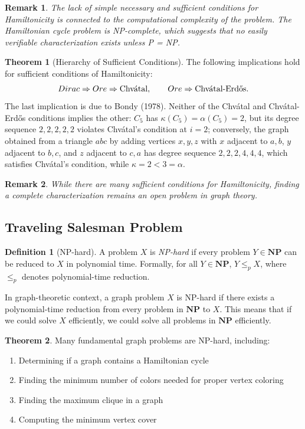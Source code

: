\documentclass{article}
\newtheorem{remark}{Remark}
\theoremstyle{definition}
\newtheorem{theorem}{Theorem}
\newtheorem{definition}{Definition}
\begin{document}
\begin{remark}
The lack of simple necessary and sufficient conditions for Hamiltonicity is connected to the computational complexity of the problem. The Hamiltonian cycle problem is NP-complete, which suggests that no easily verifiable characterization exists unless P = NP.
\end{remark}

\begin{theorem}[Hierarchy of Sufficient Conditions]
The following implications hold for sufficient conditions of Hamiltonicity:
\[Dirac \Rightarrow Ore \Rightarrow \text{Chv\'{a}tal}, \qquad Ore \Rightarrow \text{Chv\'{a}tal-Erd\H{o}s}.\]
The last implication is due to Bondy (1978). Neither of the Chv\'{a}tal and Chv\'{a}tal-Erd\H{o}s conditions implies the other: $C_5$ has $\kappa(C_5) = \alpha(C_5) = 2$, but its degree sequence $2,2,2,2,2$ violates Chv\'{a}tal's condition at $i = 2$; conversely, the graph obtained from a triangle $abc$ by adding vertices $x, y, z$ with $x$ adjacent to $a, b$, $y$ adjacent to $b, c$, and $z$ adjacent to $c, a$ has degree sequence $2,2,2,4,4,4$, which satisfies Chv\'{a}tal's condition, while $\kappa = 2 < 3 = \alpha$.
\end{theorem}

\begin{remark}
While there are many sufficient conditions for Hamiltonicity, finding a complete characterization remains an open problem in graph theory.
\end{remark}

\subsection{Traveling Salesman Problem}

\begin{definition}[NP-hard]
A problem $X$ is \emph{NP-hard} if every problem $Y \in \mathbf{NP}$ can be reduced to $X$ in polynomial time. Formally, for all $Y \in \mathbf{NP}$, $Y \leq_p X$, where $\leq_p$ denotes polynomial-time reduction.

In graph-theoretic context, a graph problem $X$ is NP-hard if there exists a polynomial-time reduction from every problem in $\mathbf{NP}$ to $X$. This means that if we could solve $X$ efficiently, we could solve all problems in $\mathbf{NP}$ efficiently.
\end{definition}

\begin{theorem}
Many fundamental graph problems are NP-hard, including:
\begin{enumerate}
    \item Determining if a graph contains a Hamiltonian cycle
    \item Finding the minimum number of colors needed for proper vertex coloring
    \item Finding the maximum clique in a graph
    \item Computing the minimum vertex cover
\end{enumerate}
\end{theorem}
\end{document}
